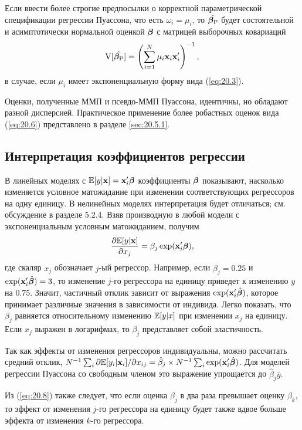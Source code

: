 Если ввести более строгие предпосылки о корректной параметрической спецификации регрессии Пуассона, что есть $\omega_i = \mu_i$, то $\hat{\bm{\beta}_{\mathrm{P}}}$ будет состоятельной и асимптотически нормальной оценкой $\bm{\beta}$ с матрицей выборочных ковариаций
    \begin{align}\label{eq:20.7}
    \mathrm{V}[\hat{\bm{\beta}_{\mathrm{P}}}] = \left( \sum^{N}_{i = 1} \mu_i \mathbf{x}_i \mathbf{x}'_i \right)^{-1},
    \end{align}
в случае, если $\mu_i$ имеет экспоненциальную форму вида (\ref{eq:20.3}).

Оценки, полученные ММП и псевдо-ММП Пуассона, идентичны, но обладают разной дисперсией. Практическое применение более робастных оценок вида (\ref{eq:20.6}) представлено в разделе \ref{sec:20.5.1}.


\subsection{Интерпретация коэффициентов регрессии}\label{sec:20.2.3}

\noindent
В линейных моделях с $\mathbb{E}[y|\mathbf{x}] = \mathbf{x}_i'\bm{\beta}$ коэффициенты $\bm{\beta}$ показывают, насколько изменяется условное матожидание при изменении соответствующих регрессоров на одну единицу. В нелинейных моделях интерпретация будет отличаться; см. обсуждение в разделе 5.2.4. Взяв производную в любой модели с экспоненциальным условным матожиданием, получим
    \begin{align}\label{eq:20.8}
    \frac{\partial\mathbb{E}[y|\mathbf{x}]}{\partial x_j} = \beta_j \exp(\mathbf{x}_i'\bm{\beta}),
    \end{align}
где скаляр $x_j$ обозначает $j$-ый регрессор. Например, если $\hat{\beta}_j = 0.25$ и $\exp(\mathbf{x}'_i\hat{\bm{\beta}}) = 3$, то изменение $j$-го регрессора на единицу приведет к изменению $y$ на $0.75$. Значит, частичный отклик зависит от выражения $\exp(\mathbf{x}'_i\hat{\bm{\beta}})$, которое принимает различные значения в зависимости от индивида. Легко показать, что $\beta_j$ равняется относительному изменению $\mathbb{E}[y|x]$ при изменении $x_j$ на единицу. Если $x_j$ выражен в логарифмах, то $\beta_j$ представляет собой эластичность.

Так как эффекты от изменения регрессоров индивидуальны, можно рассчитать средний отклик, $N^{-1} \sum_i \partial \mathbb{E}[y_i|\mathbf{x}_i]/\partial x_{ij} = \hat{\beta}_j \times N^{-1} \sum_i \exp(\mathbf{x}'_i\hat{\bm{\beta}})$. Для моделей регрессии Пуассона со свободным членом это выражение упрощается до $\hat{\beta}_j \bar{y}$.

Из (\ref{eq:20.8}) также следует, что если оценка $\beta_j$ в два раза превышает оценку $\beta_k$, то эффект от изменения $j$-го регрессора на единицу будет также вдвое больше эффекта от изменения $k$-го регрессора.


